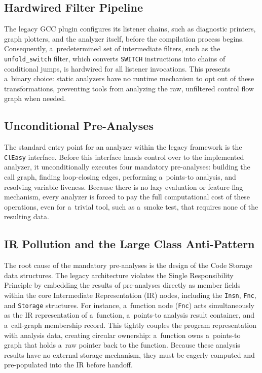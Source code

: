 \documentclass[xpsejal00-gcc-plugin.tex]{subfiles}
\begin{document}
\subsection*{Hardwired Filter Pipeline}\label{sub:filter}

The legacy GCC plugin configures its listener chains, such as diagnostic printers, graph plotters, and the analyzer itself, before the compilation process begins.
Consequently, a~predetermined set of intermediate filters, such as the \texttt{unfold\_switch} filter, which converts \texttt{SWITCH} instructions into chains of conditional jumps, is hardwired for all listener invocations.
This presents a~binary choice: static analyzers have no runtime mechanism to opt out of these transformations, preventing tools from analyzing the raw, unfiltered control flow graph when needed.

\subsection*{Unconditional Pre-Analyses}\label{sub:pre-analyses}

The standard entry point for an analyzer within the legacy framework is the \texttt{ClEasy} interface.
Before this interface hands control over to the implemented analyzer, it unconditionally executes four mandatory pre-analyses: building the call graph, finding loop-closing edges, performing a~points-to analysis, and resolving variable liveness.
Because there is no lazy evaluation or feature-flag mechanism, every analyzer is forced to pay the full computational cost of these operations, even for a~trivial tool, such as a~smoke test, that requires none of the resulting data.

\subsection*{IR Pollution and the Large Class Anti-Pattern}\label{sub:ir-pollution}

The root cause of the mandatory pre-analyses is the design of the Code Storage data structures.
The legacy architecture violates the Single Responsibility Principle by embedding the results of pre-analyses directly as member fields within the core Intermediate Representation (IR) nodes, including the \texttt{Insn}, \texttt{Fnc}, and \texttt{Storage} structures.
For instance, a~function node (\texttt{Fnc}) acts simultaneously as the IR representation of a~function, a~points-to analysis result container, and a~call-graph membership record.
This tightly couples the program representation with analysis data, creating circular ownership: a~function owns a~points-to graph that holds a~raw pointer back to the function.
Because these analysis results have no external storage mechanism, they must be eagerly computed and pre-populated into the IR before handoff.
\end{document}
